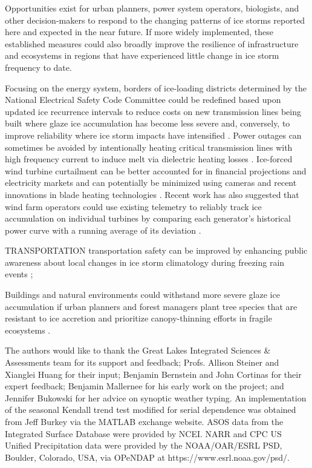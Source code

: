 \documentclass[twocol]{ametsoc}
\begin{document}
Opportunities exist for urban planners, power system operators, biologists, and other decision-makers to respond to the changing patterns of ice storms reported here and expected in the near future. If more widely implemented, these established measures could also broadly improve the resilience of infrastructure and ecosystems in regions that have experienced little change in ice storm frequency to date. 

Focusing on the energy system, borders of ice-loading districts determined by the National Electrical Safety Code Committee could be redefined based upon updated ice recurrence intervals to reduce costs on new transmission lines being built where glaze ice accumulation has become less severe and, conversely, to improve reliability where ice storm impacts have intensified \citep{american2013minimum}. Power outages can sometimes be avoided by intentionally heating critical transmission lines with high frequency current to induce melt via dielectric heating losses \citep{bendel1981review,huneault2005combined}. Ice-forced wind turbine curtailment can be better accounted for in financial projections and electricity markets and can potentially be minimized using cameras and recent innovations in blade heating technologies \citep{bird2014wind}. Recent work has also suggested that wind farm operators could use existing telemetry to reliably track ice accumulation on individual turbines by comparing each generator's historical power curve with a running average of its deviation \citep{davis2016ice}.

TRANSPORTATION 
transportation safety can be improved by enhancing public awareness about local changes in ice storm climatology during freezing rain events \citep{call2009assessment}; 


Buildings and natural environments could withstand more severe glaze ice accumulation if urban planners and forest managers plant tree species that are resistant to ice accretion and prioritize canopy-thinning efforts in fragile ecosystems \citep{hauer2006trees}.


\nocite{*}


%
\acknowledgments
The authors would like to thank the Great Lakes Integrated Sciences \& Assessments team for its support and feedback; Profs. Allison Steiner and Xianglei Huang for their input; Benjamin Bernstein and John Cortinas for their expert feedback; Benjamin Mallernee for his early work on the project; and Jennifer Bukowski for her advice on synoptic weather typing. An implementation of the seasonal Kendall trend test modified for serial dependence was obtained from Jeff Burkey via the MATLAB exchange website. ASOS data from the Integrated Surface Database were provided by NCEI. NARR and CPC US Unified Precipitation data were provided by the NOAA/OAR/ESRL PSD, Boulder, Colorado, USA, via OPeNDAP at https://www.esrl.noaa.gov/psd/.  



\end{document}
